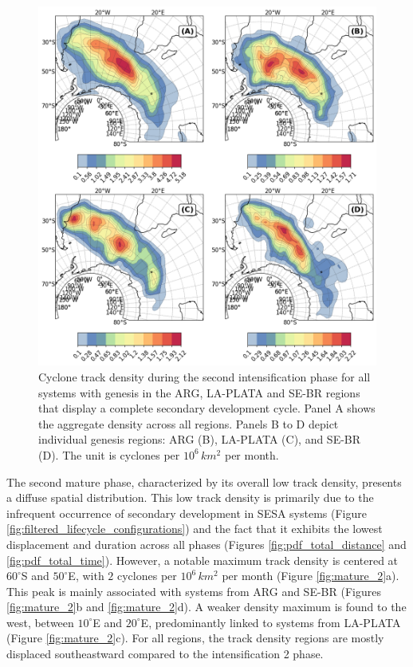 \begin{figure}[!htbp]
\centering
\includegraphics[width=\textwidth]{figs_4/density_map_intensification 2_regions_secondary.png}
\caption[Track Density - Intensification 2]{Cyclone track density during the second intensification phase for all systems with genesis in the ARG, LA-PLATA and SE-BR regions that display a complete secondary development cycle. Panel A shows the aggregate density across all regions. Panels B to D depict individual genesis regions: ARG (B), LA-PLATA (C), and SE-BR (D). The unit is cyclones per \(10^6 \, km^2\) per month.}
\label{fig:intensification_2}
\end{figure}

The second mature phase, characterized by its overall low track density, presents a diffuse spatial distribution. This low track density is primarily due to the infrequent occurrence of secondary development in SESA systems (Figure \ref{fig:filtered_lifecycle_configurations}) and the fact that it exhibits the lowest displacement and duration across all phases (Figures \ref{fig:pdf_total_distance} and \ref{fig:pdf_total_time}). However, a notable maximum track density is centered at \(60^\circ\)S and \(50^\circ\)E, with \(2\) cyclones per \(10^6 \, km^2\) per month (Figure \ref{fig:mature_2}a). This peak is mainly associated with systems from ARG and SE-BR (Figures \ref{fig:mature_2}b and \ref{fig:mature_2}d). A weaker density maximum is found to the west, between \(10^\circ\)E and \(20^\circ\)E, predominantly linked to systems from LA-PLATA (Figure \ref{fig:mature_2}c). For all regions, the track density regions are mostly displaced southeastward compared to the intensification 2 phase.


